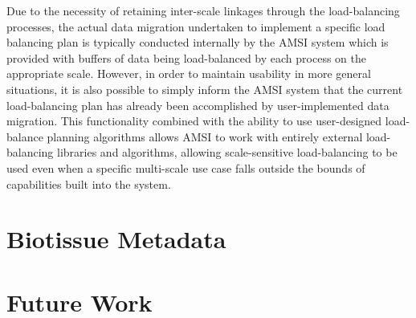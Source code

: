 \documentclass[11pt]{article}
\begin{document}
Due to the necessity of retaining inter-scale linkages through the load-balancing processes, the actual data migration undertaken to implement a specific load balancing plan is typically conducted internally by the AMSI system which is provided with buffers of data being load-balanced by each process on the appropriate scale. However, in order to maintain usability in more general situations, it is also possible to simply inform the AMSI system that the current load-balancing plan has already been accomplished by user-implemented data migration. This functionality combined with the ability to use user-designed load-balance planning algorithms allows AMSI to work with entirely external load-balancing libraries and algorithms, allowing scale-sensitive load-balancing to be used even when a specific multi-scale use case falls outside the bounds of capabilities built into the system.

\section{Biotissue Metadata}


\section{Future Work}\label{future_work}


\end{document}
